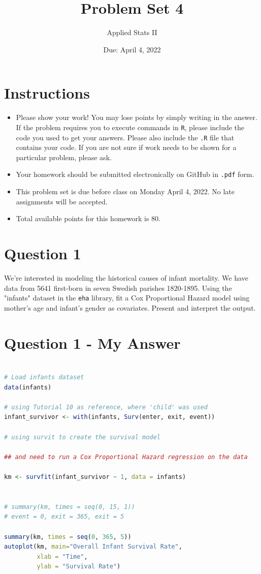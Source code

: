 \documentclass[12pt,letterpaper]{article}
\title{Problem Set 4}
\date{Due: April 4, 2022}
\author{Applied Stats II}
\begin{document}
	\maketitle
	\section*{Instructions}
	\begin{itemize}
		\item Please show your work! You may lose points by simply writing in the answer. If the problem requires you to execute commands in \texttt{R}, please include the code you used to get your answers. Please also include the \texttt{.R} file that contains your code. If you are not sure if work needs to be shown for a particular problem, please ask.
		\item Your homework should be submitted electronically on GitHub in \texttt{.pdf} form.
		\item This problem set is due before class on Monday April 4, 2022. No late assignments will be accepted.
		\item Total available points for this homework is 80.
	\end{itemize}

	\vspace{.25cm}
\section*{Question 1}
\vspace{.25cm}
\noindent We're interested in modeling the historical causes of infant mortality. We have data from 5641 first-born in seven Swedish parishes 1820-1895. Using the "infants" dataset in the \texttt{eha} library, fit a Cox Proportional Hazard model using mother's age and infant's gender as covariates. Present and interpret the output.


\section*{Question 1 - My Answer} 


\begin{lstlisting}[language=R]

# Load infants dataset
data(infants)

# using Tutorial 10 as reference, where 'child' was used
infant_survivor <- with(infants, Surv(enter, exit, event))

# using survit to create the survival model

## and need to run a Cox Proportional Hazard regression on the data

km <- survfit(infant_survivor ~ 1, data = infants)


# summary(km, times = seq(0, 15, 1))
# event = 0, exit = 365, exit = 5 

summary(km, times = seq(0, 365, 5))
autoplot(km, main="Overall Infant Survival Rate",
         xlab = "Time",
         ylab = "Survival Rate")


\end{lstlisting}
\end{document}
